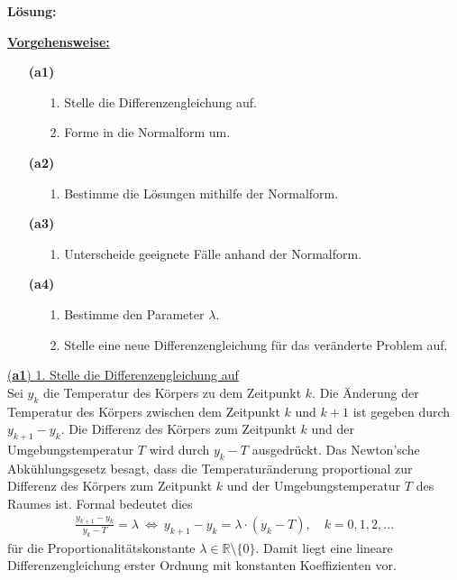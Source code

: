\textbf{Lösung:}
\begin{mdframed}
\underline{\textbf{Vorgehensweise:}}
\renewcommand{\labelenumi}{\theenumi.}
\begin{enumerate}
\item[\textbf{(a1)}]
\begin{enumerate}
	\item[1.] Stelle die Differenzengleichung auf.
	\item[2.] Forme in die Normalform um.
\end{enumerate} 
\item[\textbf{(a2)}]
\begin{enumerate}
	\item[1.] Bestimme die Lösungen mithilfe der Normalform.
\end{enumerate} 
\item[\textbf{(a3)}]
\begin{enumerate}
	\item[1.] Unterscheide geeignete Fälle anhand der Normalform.
\end{enumerate}
\item[\textbf{(a4)}]
\begin{enumerate}
	\item[1.] Bestimme den Parameter $ \lambda $.
	\item[2.] Stelle eine neue Differenzengleichung für das veränderte Problem auf.
\end{enumerate}  
\end{enumerate}
\end{mdframed}
\underline{(\textbf{a1}) 1. Stelle die Differenzengleichung auf}\\
Sei $ y_k $ die Temperatur des Körpers zu dem Zeitpunkt $ k $.
Die Änderung der Temperatur des Körpers zwischen dem Zeitpunkt $ k $ und $ k+1 $ ist gegeben durch $ y_{k+1} - y_k $.
Die Differenz des Körpers zum Zeitpunkt $ k $ und der Umgebungstemperatur $ T $ wird durch $ y_k - T $ ausgedrückt.
Das Newton'sche Abkühlungsgesetz besagt, dass die Temperaturänderung proportional zur Differenz des Körpers zum Zeitpunkt $ k $ und der Umgebungstemperatur $ T $ des Raumes ist.
Formal bedeutet dies
\begin{align*}
	\frac{y_{k+1}- y_k}{y_k - T} = \lambda
	\ \Leftrightarrow \
	y_{k+1} - y_k = \lambda \cdot (y_k - T), \quad k = 0,1,2,...
\end{align*}
für die Proportionalitätskonstante $ \lambda \in \mathbb{R} \setminus \{0\} $.
Damit liegt eine lineare Differenzengleichung erster Ordnung mit konstanten Koeffizienten vor.\\
